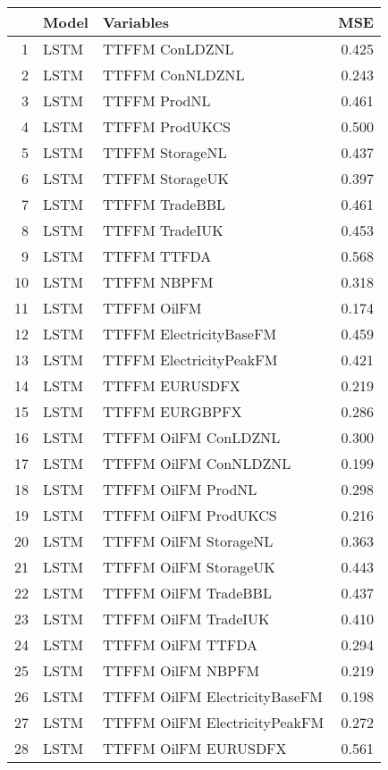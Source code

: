 \begin{table}[ht]
\centering
\begin{tabular}{rllr}
  \hline
 & Model & Variables & MSE \\ 
  \hline
1 & LSTM & TTFFM ConLDZNL & 0.425 \\ 
  2 & LSTM & TTFFM ConNLDZNL & 0.243 \\ 
  3 & LSTM & TTFFM ProdNL & 0.461 \\ 
  4 & LSTM & TTFFM ProdUKCS & 0.500 \\ 
  5 & LSTM & TTFFM StorageNL & 0.437 \\ 
  6 & LSTM & TTFFM StorageUK & 0.397 \\ 
  7 & LSTM & TTFFM TradeBBL & 0.461 \\ 
  8 & LSTM & TTFFM TradeIUK & 0.453 \\ 
  9 & LSTM & TTFFM TTFDA & 0.568 \\ 
  10 & LSTM & TTFFM NBPFM & 0.318 \\ 
  11 & LSTM & TTFFM OilFM & 0.174 \\ 
  12 & LSTM & TTFFM ElectricityBaseFM & 0.459 \\ 
  13 & LSTM & TTFFM ElectricityPeakFM & 0.421 \\ 
  14 & LSTM & TTFFM EURUSDFX & 0.219 \\ 
  15 & LSTM & TTFFM EURGBPFX & 0.286 \\ 
  16 & LSTM & TTFFM OilFM ConLDZNL & 0.300 \\ 
  17 & LSTM & TTFFM OilFM ConNLDZNL & 0.199 \\ 
  18 & LSTM & TTFFM OilFM ProdNL & 0.298 \\ 
  19 & LSTM & TTFFM OilFM ProdUKCS & 0.216 \\ 
  20 & LSTM & TTFFM OilFM StorageNL & 0.363 \\ 
  21 & LSTM & TTFFM OilFM StorageUK & 0.443 \\ 
  22 & LSTM & TTFFM OilFM TradeBBL & 0.437 \\ 
  23 & LSTM & TTFFM OilFM TradeIUK & 0.410 \\ 
  24 & LSTM & TTFFM OilFM TTFDA & 0.294 \\ 
  25 & LSTM & TTFFM OilFM NBPFM & 0.219 \\ 
  26 & LSTM & TTFFM OilFM ElectricityBaseFM & 0.198 \\ 
  27 & LSTM & TTFFM OilFM ElectricityPeakFM & 0.272 \\ 
  28 & LSTM & TTFFM OilFM EURUSDFX & 0.561 \\ 

\end{tabular}
\end{table}
